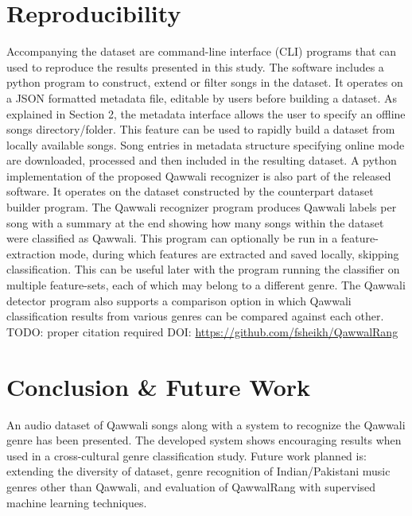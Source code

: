 \documentclass{article}
\begin{document}
\section{Reproducibility}
Accompanying the dataset are command-line interface (CLI) programs that can used to reproduce the results presented in this study. The software includes a python program to construct, extend or filter songs in the dataset. It operates on a JSON \citep{json} formatted metadata file, editable by users before building a dataset. As explained in Section 2, the metadata interface allows the user to specify an offline songs directory/folder. This feature can be used to rapidly build a dataset from locally available songs. Song entries in metadata structure specifying online mode are downloaded, processed and then included in the resulting dataset. A python implementation of the proposed Qawwali recognizer is also part of the released software. It operates on the dataset constructed by the counterpart dataset builder program. The Qawwali recognizer program produces Qawwali labels per song with a summary at the end showing how many songs within the dataset were classified as Qawwali. This program can optionally be run in a feature-extraction mode, during which features are extracted and saved locally, skipping classification. This can be useful later with the program running the classifier on multiple feature-sets,  each of which may belong to a different genre. The Qawwali detector program also supports a comparison option in which Qawwali classification results from various genres can be compared against each other. TODO: proper citation required DOI: \url{https://github.com/fsheikh/QawwalRang}
\section{Conclusion \& Future Work}
An audio dataset of Qawwali songs along with a system to recognize the Qawwali genre has been presented. The developed system shows encouraging results when used in a cross-cultural genre classification study. Future work planned is: extending the diversity of dataset, genre recognition of Indian/Pakistani music genres other than Qawwali, and evaluation of QawwalRang with supervised machine learning techniques.

\end{document}
